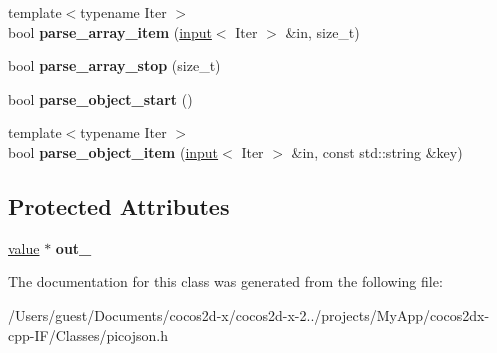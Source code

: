 \begin{DoxyCompactItemize}
\item 
\hypertarget{classpicojson_1_1default__parse__context_a5f65224e655633b20c1f8c5967c153bb}{{\footnotesize template$<$typename Iter $>$ }\\bool {\bfseries parse\-\_\-array\-\_\-item} (\hyperlink{classpicojson_1_1input}{input}$<$ Iter $>$ \&in, size\-\_\-t)}\label{classpicojson_1_1default__parse__context_a5f65224e655633b20c1f8c5967c153bb}

\item 
\hypertarget{classpicojson_1_1default__parse__context_aa6ac46d87d620377429438675ba9fab2}{bool {\bfseries parse\-\_\-array\-\_\-stop} (size\-\_\-t)}\label{classpicojson_1_1default__parse__context_aa6ac46d87d620377429438675ba9fab2}

\item 
\hypertarget{classpicojson_1_1default__parse__context_a54eba00b93ce4cdaf8b2acac4ef3e046}{bool {\bfseries parse\-\_\-object\-\_\-start} ()}\label{classpicojson_1_1default__parse__context_a54eba00b93ce4cdaf8b2acac4ef3e046}

\item 
\hypertarget{classpicojson_1_1default__parse__context_adf71929b098e4f4b5c32222af149655a}{{\footnotesize template$<$typename Iter $>$ }\\bool {\bfseries parse\-\_\-object\-\_\-item} (\hyperlink{classpicojson_1_1input}{input}$<$ Iter $>$ \&in, const std\-::string \&key)}\label{classpicojson_1_1default__parse__context_adf71929b098e4f4b5c32222af149655a}

\end{DoxyCompactItemize}
\subsection*{Protected Attributes}
\begin{DoxyCompactItemize}
\item 
\hypertarget{classpicojson_1_1default__parse__context_a89547d73da32e470068649e54646ff19}{\hyperlink{classpicojson_1_1value}{value} $\ast$ {\bfseries out\-\_\-}}\label{classpicojson_1_1default__parse__context_a89547d73da32e470068649e54646ff19}

\end{DoxyCompactItemize}


The documentation for this class was generated from the following file\-:\begin{DoxyCompactItemize}
\item 
/\-Users/guest/\-Documents/cocos2d-\/x/cocos2d-\/x-\/2../projects/\-My\-App/cocos2dx-\/cpp-\/\-I\-F/\-Classes/picojson.\-h\end{DoxyCompactItemize}
